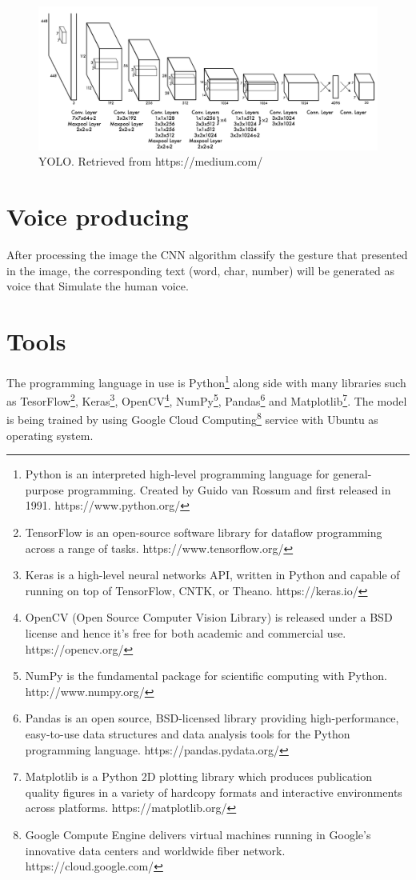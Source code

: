 \documentclass[12pt]{report}
\begin{document}
\bigbreak
\bigbreak
\bigbreak

\clearpage
\begin{figure}[h]
    \centering
    \includegraphics[width=1\textwidth]{./images/yolo.png}
    \caption{YOLO. Retrieved from https://medium.com/}
    \label{fig:frcnn}
\end{figure} 

\bigbreak
\bigbreak

\section{Voice producing}

After processing the image the CNN algorithm classify the gesture
that presented in the image, the corresponding text (word, char, number)
will be generated as voice that Simulate the human voice. 

\section{Tools}

The programming language in use is Python\footnote{Python is an interpreted high-level programming language for general-purpose programming. Created by Guido van Rossum and first released in 1991. https://www.python.org/} along side with many
libraries such as TesorFlow\footnote{TensorFlow is an open-source software library for dataflow programming across a range of tasks. https://www.tensorflow.org/},
Keras\footnote{Keras is a high-level neural networks API, written in Python and capable of running on top of TensorFlow, CNTK, or Theano. https://keras.io/}, 
OpenCV\footnote{OpenCV (Open Source Computer Vision Library) is released under a BSD license and hence it’s free for both academic and commercial use. https://opencv.org/}, 
NumPy\footnote{NumPy is the fundamental package for scientific computing with Python. http://www.numpy.org/}, 
Pandas\footnote{Pandas is an open source, BSD-licensed library providing high-performance, easy-to-use data structures and data analysis tools for the Python programming language. https://pandas.pydata.org/}
and Matplotlib\footnote{Matplotlib is a Python 2D plotting library which produces publication quality figures in a variety of hardcopy formats and interactive environments across platforms. https://matplotlib.org/}.
The model is being trained by using Google Cloud Computing\footnote{Google Compute Engine delivers virtual machines running in Google's innovative data centers and worldwide fiber network. https://cloud.google.com/} service with Ubuntu as operating system.


\renewcommand\bibname{References}            


\end{document}

